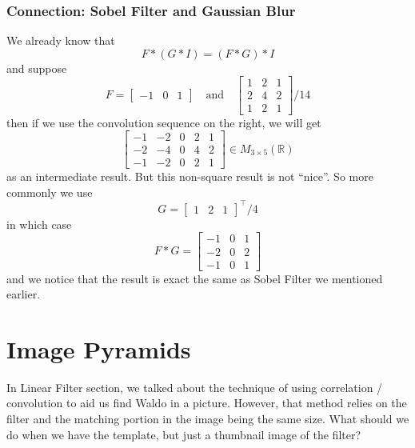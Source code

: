 \documentclass[11pt]{article}
\newcommand{\R}{\mathbb{R}}
\newcommand{\mat}[2]{M_{#1 \times #2}(\R)}
\begin{document}
\subsubsection{Connection: Sobel Filter and Gaussian Blur} 
We already know that 
\begin{equation}
	F *(G * I)=(F * G) * I
\end{equation}
and suppose 
\begin{equation}
	F = \begin{bmatrix}
		-1 & 0 & 1
	\end{bmatrix}\quad \text{and} \quad \begin{bmatrix}
		1 & 2 & 1 \\
		2 & 4 & 2 \\
		1 & 2 & 1 
	\end{bmatrix} / 14
\end{equation}
then if we use the convolution sequence on the right, we will get 
\begin{equation}
	\left[
		\begin{array}{ccccc}
			-1 & -2 & 0 & 2 & 1 \\
			-2 & -4 & 0 & 4 & 2 \\
			-1 & -2 & 0 & 2 & 1
		\end{array}
	\right] \in \mat{3}{5}
\end{equation}
as an intermediate result. But this non-square result is not ``nice''. So more commonly we use 
\begin{equation}
	G = 
	\begin{bmatrix}
		1 & 2 & 1 
	\end{bmatrix}^ \top / 4
\end{equation}
in which case 
\begin{equation}
	F * G = \begin{bmatrix}
		-1 & 0 & 1 \\
		-2 & 0 & 2 \\
		-1 & 0 & 1
	\end{bmatrix}
\end{equation}
and we notice that the result is exact the same as Sobel Filter we mentioned earlier. 

\section{Image Pyramids}
In Linear Filter section, we talked about the technique of using correlation / convolution to aid us find Waldo in a picture. However, that method relies on the filter and the matching portion in the image being the same size. What should we do when we have the template, but just a thumbnail image of the filter? 
\end{document}

